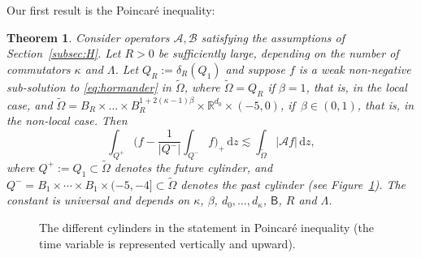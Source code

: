 \documentclass[10pt,a4paper]{amsart}
\newtheorem{theorem}{Theorem}
\theoremstyle{definition}
\newcommand\R{{\mathbb R}}
\newcommand{\cA}{{\mathcal A}}
\newcommand{\cB}{{\mathcal B}}
\newcommand{\sB}{{\mathsf B}}
\newcommand{\dd}{{\, \mathrm d}}
\begin{document}
Our first result is the Poincaré inequality:
\begin{theorem}
\label{thm:poincare}
Consider operators $\cA, \cB$ satisfying the assumptions of Section~\ref{subsec:H}. Let $R >0$ be sufficiently large, depending on the
number of commutators $\kappa$ and $\Lambda$. Let \(Q_R :=\delta_R\left(Q_1\right)\)
and suppose $f$ is a weak non-negative sub-solution to
\eqref{eq:hormander} in $\tilde \Omega$, where $\tilde \Omega \!=\! Q_R$ if $\beta \!=\! 1$, that is, in the local case, and \(\tilde \Omega \!=\! B_R\!\times\! \dots \!\times\! B_R^{1 + 2(\kappa-1)\beta} \!\times\! \R^{d_0} \!\times\! (-5,0)\), if~$\beta \in (0, 1)$, that is, in the non-local case. Then
\begin{equation}
\label{eq:poincare}
\int_{Q^+} \biggl(f - \frac{1}{|Q^-|} \int_{Q^-}
f \biggr)_+ \dd z \lesssim
\int_{\tilde \Omega} \big\vert \cA f\big\vert \dd z,
\end{equation}
where $Q^+ \!:=\! Q_1 \!\subset\! \tilde \Omega$ denotes the future cylinder,
and
$Q^-\!=\!B_1 \!\times\! \cdots \!\times\! B_1\! \times (-5,-4] \!\subset\!
\tilde\Omega$ denotes the past cylinder (see
Figure~\ref{fig:main-result}).
The constant is universal and
depends on $\kappa$, $\beta$, $d_0,\dots,d_\kappa$, $\sB$, $R$
and $\Lambda$.
\end{theorem}

\begin{figure}[htb]
\centering


\caption{The different cylinders in the statement in Poincaré
inequality (the time variable is represented vertically and
upward).}\label{fig:main-result}
\end{figure}
\end{document}
